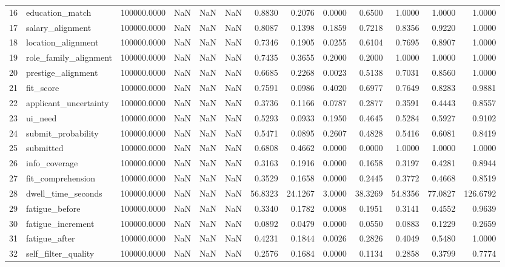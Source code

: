 \begin{tabular}{rlrrlrrrrrrrr}
16 & education_match & 100000.0000 & NaN & NaN & NaN & 0.8830 & 0.2076 & 0.0000 & 0.6500 & 1.0000 & 1.0000 & 1.0000 \\
17 & salary_alignment & 100000.0000 & NaN & NaN & NaN & 0.8087 & 0.1398 & 0.1859 & 0.7218 & 0.8356 & 0.9220 & 1.0000 \\
18 & location_alignment & 100000.0000 & NaN & NaN & NaN & 0.7346 & 0.1905 & 0.0255 & 0.6104 & 0.7695 & 0.8907 & 1.0000 \\
19 & role_family_alignment & 100000.0000 & NaN & NaN & NaN & 0.7435 & 0.3655 & 0.2000 & 0.2000 & 1.0000 & 1.0000 & 1.0000 \\
20 & prestige_alignment & 100000.0000 & NaN & NaN & NaN & 0.6685 & 0.2268 & 0.0023 & 0.5138 & 0.7031 & 0.8560 & 1.0000 \\
21 & fit_score & 100000.0000 & NaN & NaN & NaN & 0.7591 & 0.0986 & 0.4020 & 0.6977 & 0.7649 & 0.8283 & 0.9881 \\
22 & applicant_uncertainty & 100000.0000 & NaN & NaN & NaN & 0.3736 & 0.1166 & 0.0787 & 0.2877 & 0.3591 & 0.4443 & 0.8557 \\
23 & ui_need & 100000.0000 & NaN & NaN & NaN & 0.5293 & 0.0933 & 0.1950 & 0.4645 & 0.5284 & 0.5927 & 0.9102 \\
24 & submit_probability & 100000.0000 & NaN & NaN & NaN & 0.5471 & 0.0895 & 0.2607 & 0.4828 & 0.5416 & 0.6081 & 0.8419 \\
25 & submitted & 100000.0000 & NaN & NaN & NaN & 0.6808 & 0.4662 & 0.0000 & 0.0000 & 1.0000 & 1.0000 & 1.0000 \\
26 & info_coverage & 100000.0000 & NaN & NaN & NaN & 0.3163 & 0.1916 & 0.0000 & 0.1658 & 0.3197 & 0.4281 & 0.8944 \\
27 & fit_comprehension & 100000.0000 & NaN & NaN & NaN & 0.3529 & 0.1658 & 0.0000 & 0.2445 & 0.3772 & 0.4668 & 0.8519 \\
28 & dwell_time_seconds & 100000.0000 & NaN & NaN & NaN & 56.8323 & 24.1267 & 3.0000 & 38.3269 & 54.8356 & 77.0827 & 126.6792 \\
29 & fatigue_before & 100000.0000 & NaN & NaN & NaN & 0.3340 & 0.1782 & 0.0008 & 0.1951 & 0.3141 & 0.4552 & 0.9639 \\
30 & fatigue_increment & 100000.0000 & NaN & NaN & NaN & 0.0892 & 0.0479 & 0.0000 & 0.0550 & 0.0883 & 0.1229 & 0.2659 \\
31 & fatigue_after & 100000.0000 & NaN & NaN & NaN & 0.4231 & 0.1844 & 0.0026 & 0.2826 & 0.4049 & 0.5480 & 1.0000 \\
32 & self_filter_quality & 100000.0000 & NaN & NaN & NaN & 0.2576 & 0.1684 & 0.0000 & 0.1134 & 0.2858 & 0.3799 & 0.7774 \\

\end{tabular}

